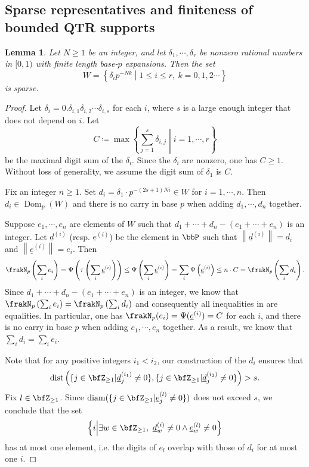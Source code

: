 \documentclass[english,oneside]{smfart}
\newcommand{\opn}[1]{\operatorname{#1}}
\newcommand{\uld}{\underline{d}}
\newcommand{\norm}[1]{\left\lVert#1\right\rVert}
\newtheorem{lemma}[theorem]{Lemma}
\begin{document}
\subsection{Sparse representatives and finiteness of bounded QTR supports}
\begin{lemma}\label{lem:57121}
    Let $N\geq 1$ be an integer, and let $\delta_1,\cdots,\delta_r$ be nonzero rational numbers in $[0,1)$ with finite length base-$p$ expansions. Then the set
    $$W=\left\{\delta_ip^{-Nk}\middle\vert1\leq i\leq r,\ k=0,1,2\cdots\right\}$$
    is sparse.
\end{lemma}
\begin{proof}
    Let $\delta_i=0.\delta_{i,1}\delta_{i,2}\cdots\delta_{i,s}$ for each $i$, where $s$ is a large enough integer that does not depend on $i$. Let
    $$C\coloneqq\max\left\{\sum_{j=1}^s\delta_{i,j}\middle\vert i=1,\cdots,r\right\}$$
    be the maximal digit sum of the $\delta_i$. Since the $\delta_i$ are nonzero, one has $C\geq 1$. Without loss of generality, we assume the digit sum of $\delta_1$ is $C$.

    Fix an integer $n\geq 1$. Set $d_i=\delta_1\cdot p^{-(2s+1)Ni}\in W$ for $i=1,\cdots,n$. Then $d_i\in \opn{Dom}_p(W)$ and there is no carry in base $p$ when adding $d_1,\cdots,d_n$ together.

    Suppose $e_1,\cdots,e_n$ are elements of $W$ such that $d_1+\cdots+d_n-(e_1+\cdots+e_n)$ is an integer. Let $\uld^{(i)}$ (resp. $\underline{e}^{(i)}$) be the element in $\bbP$ such that $\norm{\uld^{(i)}}=d_i$ and $\norm{\underline{e}^{(i)}}=e_i$. Then
    \begin{equation}\label{eq:14517}
        \frakN_p\left(\sum_i e_i\right)=\Psi\left(\tau\left(\sum_i \underline{e}^{(i)}\right)\right)\leq \Psi\left(\sum_i \underline{e}^{(i)}\right)=\sum_i \Psi\left(\underline{e}^{(i)}\right)\leq n\cdot C=\frakN_p\left(\sum_i d_i\right).
    \end{equation}
    Since $d_1+\cdots+d_n-(e_1+\cdots+e_n)$ is an integer, we know that $\frakN_p\left(\sum_i e_i\right)=\frakN_p\left(\sum_i d_i\right)$ and consequently all inequalities in  are equalities. In particular, one has $\frakN_p(e_i)=\Psi(\underline{e}^{(i)})=C$ for each $i$, and there is no carry in base $p$ when adding $e_1,\cdots,e_n$ together. As a result, we know that $\sum_i d_i=\sum_i e_i$.

    Note that for any positive integers $i_1<i_2$, our construction of the $d_i$ ensures that
    $$\opn{dist}\left(\{j\in\bfZ_{\geq 1}|\uld^{(i_1)}_j\neq 0\},\{j\in\bfZ_{\geq 1}|\uld^{(i_2)}_j\neq 0\}\right)>s.$$
    Fix $l\in\bfZ_{\geq 1}$. Since $\opn{diam}(\{j\in\bfZ_{\geq 1}|\underline{e}^{(l)}_j\neq 0\})$ does not exceed $s$, we conclude that the set
    $$\left\{i\middle\vert\exists w\in\bfZ_{\geq 1},\ \uld^{(i)}_w\neq 0\wedge \underline{e}^{(l)}_w\neq 0\right\}$$
    has at most one element, i.e. the digits of $e_l$ overlap with those of $d_i$ for at most one $i$.


\end{proof}
\end{document}
